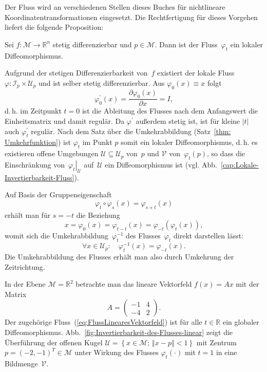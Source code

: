 Der Fluss wird an verschiedenen Stellen dieses Buches für nichtlineare
Koordinatentransformationen eingesetzt. Die Rechtfertigung für dieses
Vorgehen liefert die folgende Proposition:
\begin{proposition}
\label{pro:Lokale-Invertierbarkeit-Fluss}Sei
$f:\mathcal{M}\to{\mathbb{R}}^{n}$ stetig differenzierbar und $p\in\mathcal{M}$.
Dann ist der Fluss~$\varphi_{t}$ ein lokaler Diffeomorphismus.
\end{proposition}
\begin{svmultproof}
Aufgrund der stetigen Differenzierbarkeit von~$f$ existiert der
lokale Fluss $\varphi:\mathcal{I}_{p}\times\mathcal{U}_{p}$ und ist
selber stetig differenzierbar. Aus $\varphi_{0}(x)\equiv x$ folgt
\[
\varphi_{0}^{\prime}(x)=\frac{\partial\varphi_{0}(x)}{\partial x}=I,
\]
d.\,h. im Zeitpunkt $t=0$ ist die Ableitung des Flusses nach dem
Anfangswert die Einheitsmatrix und damit regulär. Da $\varphi^{\prime}$
außerdem stetig ist, ist für kleine $|t|$ auch $\varphi_{t}^{\prime}$
regulär. Nach dem Satz über die Umkehrabbildung (Satz~\ref{thm: Umkehrfunktion})
ist $\varphi_{t}$ im Punkt $p$ somit ein lokaler Diffeomorphismus,
d.\,h. es existieren offene Umgebungen $\mathcal{U}\subseteq\mathcal{U}_{p}$
von~$p$ und $\mathcal{V}$ von~$\varphi_{t}(p)$, so dass die Einschränkung
von~$\left.\varphi_{t}\right|_{\mathcal{U}}$ auf~$\mathcal{U}$
ein Diffeomorphismus ist (vgl. Abb.~\ref{cap:Lokale-Invertierbarkeit-Fluss}).
\end{svmultproof}


Auf Basis der Gruppeneigenschaft
\begin{equation}
\varphi_{t}\circ\varphi_{s}(x)=\varphi_{s+t}(x)\label{eq:Gruppeneigenschaft2}
\end{equation}
erhält man für $s=-t$ die Beziehung
\[
x=\varphi_{0}(x)=\varphi_{t-t}(x)=\varphi_{-t}(\varphi_{t}(x)),
\]
womit sich die Umkehrabbildung~$\varphi_{t}^{-1}$ des Flusses~$\varphi_{t}$
direkt darstellen lässt:
\begin{equation}
\forall x\in\mathcal{U}_{p}:\quad\varphi_{t}^{-1}(x)=\varphi_{-t}(x).\label{eq:InversionFluss}
\end{equation}
Die Umkehrabbildung des Flusses erhält man also durch Umkehrung der
Zeit\-richtung.
\begin{example}
\label{exa:invertierbarkeit-fluss-lin-dgl}In der Ebene $\mathcal{M}={\mathbb{R}}^{2}$
betrachte man das lineare Vektorfeld $f(x)=Ax$ mit der Matrix
\[
A=\left(\begin{array}{rr}
-1 & 4\\
-4 & 2
\end{array}\right).
\]
Der zugehörige Fluss~(\ref{eq:FlussLinearesVektorfeld}) ist für
alle $t\in{\mathbb{R}}$ ein globaler Diffeomorphismus. Abb.~\ref{fig:Invertierbarkeit-des-Flusses-linear}
zeigt die Überführung der offenen Kugel $\mathcal{U}=\left\{ x\in\mathcal{M};\,\left\Vert x-p\right\Vert <1\right\} $
mit Zentrum $p=(-2,-1)^{T}\in\mathcal{M}$ unter Wirkung des Flusses
$\varphi_{t}(\cdot)$ mit $t=1$ in eine Bildmenge~$\mathcal{V}$.
\end{example}

